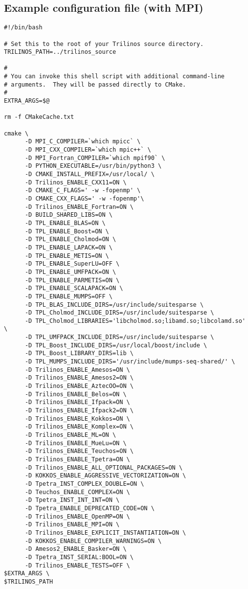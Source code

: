\subsection{Example configuration file (with MPI)}
\begin{verbatim}
#!/bin/bash

# Set this to the root of your Trilinos source directory.
TRILINOS_PATH=../trilinos_source

#
# You can invoke this shell script with additional command-line
# arguments.  They will be passed directly to CMake.
#
EXTRA_ARGS=$@

rm -f CMakeCache.txt

cmake \
      -D MPI_C_COMPILER=`which mpicc` \
      -D MPI_CXX_COMPILER=`which mpic++` \
      -D MPI_Fortran_COMPILER=`which mpif90` \
      -D PYTHON_EXECUTABLE=/usr/bin/python3 \
      -D CMAKE_INSTALL_PREFIX=/usr/local/ \
      -D Trilinos_ENABLE_CXX11=ON \
      -D CMAKE_C_FLAGS=' -w -fopenmp' \
      -D CMAKE_CXX_FLAGS=' -w -fopenmp'\
      -D Trilinos_ENABLE_Fortran=ON \
      -D BUILD_SHARED_LIBS=ON \
      -D TPL_ENABLE_BLAS=ON \
      -D TPL_ENABLE_Boost=ON \
      -D TPL_ENABLE_Cholmod=ON \
      -D TPL_ENABLE_LAPACK=ON \
      -D TPL_ENABLE_METIS=ON \
      -D TPL_ENABLE_SuperLU=OFF \
      -D TPL_ENABLE_UMFPACK=ON \
      -D TPL_ENABLE_PARMETIS=ON \
      -D TPL_ENABLE_SCALAPACK=ON \
      -D TPL_ENABLE_MUMPS=OFF \
      -D TPL_BLAS_INCLUDE_DIRS=/usr/include/suitesparse \
      -D TPL_Cholmod_INCLUDE_DIRS=/usr/include/suitesparse \
      -D TPL_Cholmod_LIBRARIES='libcholmod.so;libamd.so;libcolamd.so' \
      -D TPL_UMFPACK_INCLUDE_DIRS=/usr/include/suitesparse \
      -D TPL_Boost_INCLUDE_DIRS=/usr/local/boost/include \
      -D TPL_Boost_LIBRARY_DIRS=lib \
      -D TPL_MUMPS_INCLUDE_DIRS='/usr/include/mumps-seq-shared/' \
      -D Trilinos_ENABLE_Amesos=ON \
      -D Trilinos_ENABLE_Amesos2=ON \
      -D Trilinos_ENABLE_AztecOO=ON \
      -D Trilinos_ENABLE_Belos=ON \
      -D Trilinos_ENABLE_Ifpack=ON \
      -D Trilinos_ENABLE_Ifpack2=ON \
      -D Trilinos_ENABLE_Kokkos=ON \
      -D Trilinos_ENABLE_Komplex=ON \
      -D Trilinos_ENABLE_ML=ON \
      -D Trilinos_ENABLE_MueLu=ON \
      -D Trilinos_ENABLE_Teuchos=ON \
      -D Trilinos_ENABLE_Tpetra=ON \
      -D Trilinos_ENABLE_ALL_OPTIONAL_PACKAGES=ON \
      -D KOKKOS_ENABLE_AGGRESSIVE_VECTORIZATION=ON \
      -D Tpetra_INST_COMPLEX_DOUBLE=ON \
      -D Teuchos_ENABLE_COMPLEX=ON \
      -D Tpetra_INST_INT_INT=ON \
      -D Tpetra_ENABLE_DEPRECATED_CODE=ON \
      -D Trilinos_ENABLE_OpenMP=ON \
      -D Trilinos_ENABLE_MPI=ON \
      -D Trilinos_ENABLE_EXPLICIT_INSTANTIATION=ON \
      -D KOKKOS_ENABLE_COMPILER_WARNINGS=ON \
      -D Amesos2_ENABLE_Basker=ON \
      -D Tpetra_INST_SERIAL:BOOL=ON \
      -D Trilinos_ENABLE_TESTS=OFF \
$EXTRA_ARGS \
$TRILINOS_PATH
\end{verbatim}
